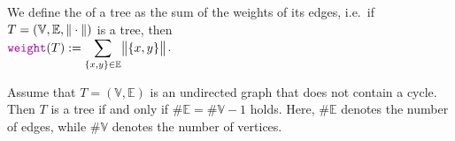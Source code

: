 \begin{Definition}
We define the  of a tree  as the sum of the weights of its edges,
i.e.~if $T = (\mathbb{V},\mathbb{E}, \|\cdot\|)$ is a tree, then
\\[0.2cm]
\hspace*{1.3cm}
$\ds \mytt{weight}(T) := \sum\limits_{\{x,y\} \in \mathbb{E}} \Weight{\{x,y\}}$.  \eoxs
\end{Definition}

\begin{Proposition}
  Assume that $T = (\mathbb{V},\mathbb{E})$ is an undirected graph that does not contain a
  cycle.  Then $T$ is a tree if and only if $\#\mathbb{E} = \#\mathbb{V} - 1$ holds.  Here, $\#\mathbb{E}$ denotes the number of edges,
  while $\#\mathbb{V}$ denotes the number of vertices.  
\end{Proposition}

